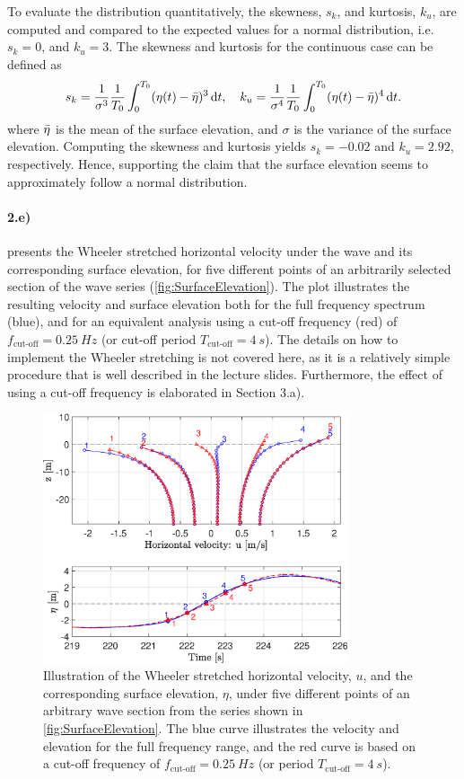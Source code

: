 To evaluate the distribution quantitatively, the skewness, $s_k$, and kurtosis, $k_u$, are computed and compared to the expected values for a normal distribution, i.e. $s_k=0$, and $k_u=3$. The skewness and kurtosis for the continuous case can be defined as
\begin{equation}
    s_k = \frac{1}{\sigma^3}\frac{1}{T_0}\int_0^{T_0} (\eta(t)-\Bar{\eta})^3 \dif t, \quad k_u = \frac{1}{\sigma^4}\frac{1}{T_0}\int_0^{T_0} (\eta(t)-\Bar{\eta})^4 \dif t.
\end{equation}
where $\Bar{\eta}$ is the mean of the surface elevation, and $\sigma$ is the variance of the surface elevation. Computing the skewness and kurtosis yields $s_k=-0.02$ and $k_u=2.92$, respectively. Hence, supporting the claim that the surface elevation seems to approximately follow a normal distribution.

\paragraph{2.e)}  presents the Wheeler stretched horizontal velocity under the wave and its corresponding surface elevation, for five different points of an arbitrarily selected section of the wave series (\cref{fig:SurfaceElevation}). The plot illustrates the resulting velocity and surface elevation both for the full frequency spectrum (blue), and for an equivalent analysis using a cut-off frequency (red) of $f_{\text{cut-off}}=\SI{0.25}{Hz}$ (or cut-off period $T_{\text{cut-off}}=\SI{4}{s}$). The details on how to implement the Wheeler stretching is not covered here, as it is a relatively simple procedure that is well described in the lecture slides. Furthermore, the effect of using a cut-off frequency is elaborated in Section 3.a).

\begin{figure}[htbp]
    \centering
    \includegraphics[width=0.8\textwidth]{Figures/Plots/etaHozvel.eps}
    \caption{Illustration of the Wheeler stretched horizontal velocity, $u$, and the corresponding surface elevation, $\eta$, under five different points of an arbitrary wave section from the series shown in \cref{fig:SurfaceElevation}. The blue curve illustrates the velocity and elevation for the full frequency range, and the red curve is based on a cut-off frequency of $f_{\text{cut-off}}=\SI{0.25}{Hz}$ (or period $T_{\text{cut-off}}=\SI{4}{s}$). }
    \label{fig:etaHozvel}
\end{figure}

